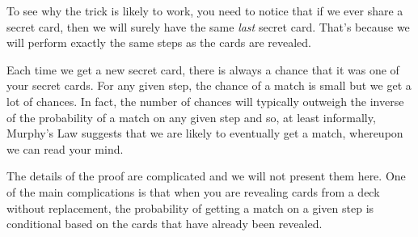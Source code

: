 To see why the trick is likely to work, you need to notice that if we
ever share a secret card, then we will surely have the same
\emph{last} secret card.  That's because we will perform exactly the
same steps as the cards are revealed.

Each time we get a new secret card, there is always a chance that it
was one of your secret cards.  For any given step, the chance of a
match is small but we get a lot of chances.  In fact, the number of
chances will typically outweigh the inverse of the probability of a
match on any given step and so, at least informally, Murphy's Law
suggests that we are likely to eventually get a match, whereupon we
can read your mind.

The details of the proof are complicated and we will not present them
here.  One of the main complications is that when you are revealing
cards from a deck without replacement, the probability of getting a
match on a given step is conditional based on the cards that have
already been revealed.

\problemsection

\endinput

